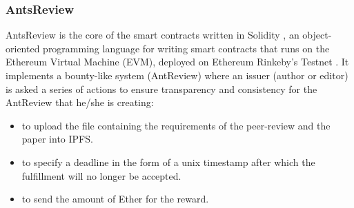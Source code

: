 \documentclass[runningheads]{llncs}
\begin{document}
\subsubsection{AntsReview}
AntsReview is the core of the smart contracts written in Solidity \cite{Solidity}, an object-oriented programming language for writing smart contracts that runs on the Ethereum Virtual Machine (EVM), deployed on Ethereum Rinkeby's Testnet \cite{Rinkeby}.
\newline It implements a bounty-like system (AntReview) where an issuer (author or editor) is asked a series of actions to ensure transparency and consistency for the AntReview that he/she is creating:
\begin{itemize}
  \item to upload the file containing the requirements of the peer-review and the paper into IPFS\cite{IPFS}.
  \item to specify a deadline in the form of a unix timestamp after which the fulfillment will no longer be accepted.
  \item to send the amount of Ether for the reward.
\end{itemize}
\end{document}

